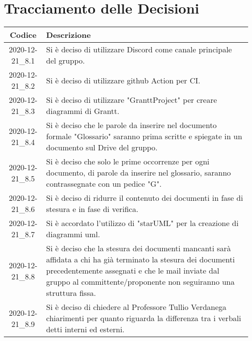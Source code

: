\section*{Tracciamento delle Decisioni}

\begin{center}
	\begin{longtable}{|c|p{13cm}|}
	\hline
	\rowcolor{lighter-grayer}
	\textbf{Codice} & \textbf{Descrizione} \\
	\hline
	\endfirsthead

	
	2020-12-21\_8.1 & Si è deciso di utilizzare Discord come canale principale del gruppo. \\
	\hline
	2020-12-21\_8.2 & Si è deciso di utilizzare github Action per CI. \\
	\hline
	2020-12-21\_8.3 & Si è deciso di utilizzare "GranttProject" per creare diagrammi di Grantt.  \\
	\hline
	2020-12-21\_8.4 & Si è deciso che le parole da inserire nel documento formale "Glossario" saranno prima scritte e spiegate in un documento sul Drive del gruppo.  \\
	\hline
	2020-12-21\_8.5 & Si è deciso che solo le prime occorrenze per ogni documento, di parole da inserire nel glossario, saranno contrassegnate con un pedice "G". \\
	\hline
	2020-12-21\_8.6 & Si è deciso di ridurre il contenuto dei documenti in fase di stesura e in fase di verifica. \\
	\hline
	2020-12-21\_8.7 & Si è accordato l'utilizzo di "starUML" per la creazione di diagrammi uml.  \\
	\hline
	2020-12-21\_8.8 & Si è deciso che la stesura dei documenti mancanti sarà affidata a chi ha già terminato la stesura dei documenti precedentemente assegnati e che le mail inviate dal gruppo al committente/proponente non seguiranno una struttura fissa.  \\
	\hline
	2020-12-21\_8.9 & Si è deciso di chiedere al Professore Tullio Verdanega chiarimenti per quanto riguarda la differenza tra i verbali detti interni ed esterni.  \\
	

	\end{longtable}
\end{center}

